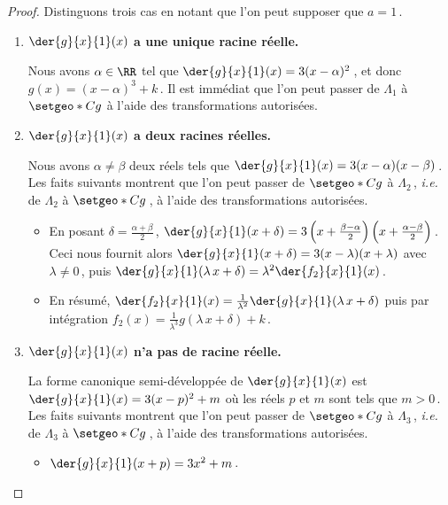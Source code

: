 \begin{proof}
	Distinguons trois cas en notant que l'on peut supposer que $a = 1$\,.
	
	\begin{enumerate}
		\item \textbf{$\der{g}{x}{1}(x)$ a une unique racine réelle.}

		      \smallskip

		      \noindent
		      Nous avons $\alpha \in \RR$ tel que $\der{g}{x}{1}(x) = 3(x - \alpha)^2$\,, et donc $g(x) = (x - \alpha)^3 + k$\,.
		      Il est immédiat que l'on peut passer de $\Lambda_1$ à $\setgeo*{C}{g}$ à l'aide des transformations autorisées.


		\medskip
		
		\item \textbf{$\der{g}{x}{1}(x)$ a deux racines réelles.}

		      \smallskip

		      \noindent
		      Nous avons $\alpha \neq \beta$ deux réels tels que $\der{g}{x}{1}(x) = 3 (x - \alpha) (x - \beta)$\,.
		      Les faits suivants montrent que l'on peut passer de $\setgeo*{C}{g}$ à $\Lambda_2$\,, \emph{i.e.} de $\Lambda_2$ à $\setgeo*{C}{g}$\,, à l'aide des transformations autorisées.
		      \begin{itemize}
		      		\item En posant $\delta = \frac{\alpha + \beta}{2}$\,,
						  $\der{g}{x}{1}(x + \delta) = 3 \left( x + \frac{\beta - \alpha}{2} \right) \left( x + \frac{\alpha - \beta}{2} \right)$\,.
				          Ceci nous fournit alors
				          $\der{g}{x}{1}(x + \delta) = 3 ( x - \lambda) (x + \lambda)$
				          avec $\lambda \neq 0$\,,
				          puis
				          $\der{g}{x}{1}( \lambda \, x + \delta) = \lambda^2 \der{f_2}{x}{1}(x)$\,.

		      		\item En résumé,
				          $\der{f_2}{x}{1}(x) = \frac{1}{\lambda^2} \der{g}{x}{1}(\lambda \, x + \delta)$
				          puis par intégration
				          $f_2(x) = \frac{1}{\lambda^3} g(\lambda \, x + \delta) + k$\,.
		      \end{itemize}


		
		\medskip
		
		\item \textbf{$\der{g}{x}{1}(x)$ n'a pas de racine réelle.}

		      \smallskip

		      \noindent
		      La forme canonique semi-développée de $\der{g}{x}{1}(x)$ est
		      $\der{g}{x}{1}(x) = 3(x - p)^2 + m$ où les réels $p$ et $m$ sont tels que $m > 0$\,.
		      Les faits suivants montrent que l'on peut passer de $\setgeo*{C}{g}$ à $\Lambda_3$\,, \emph{i.e.} de $\Lambda_3$ à $\setgeo*{C}{g}$\,, à l'aide des transformations autorisées.
		      \begin{itemize}
		      		\item $\der{g}{x}{1}(x + p) = 3 x^2 + m$\,.
				          


\end{itemize}
\end{enumerate}
\end{proof}
